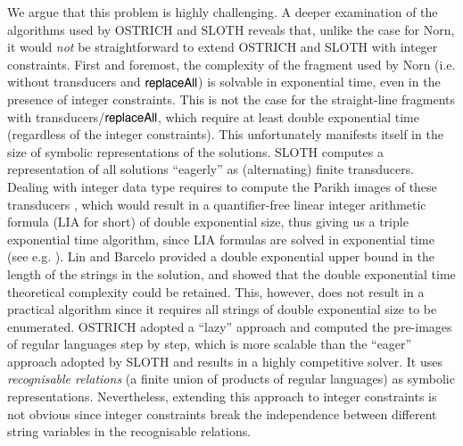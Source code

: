 We argue that this problem is highly challenging.
A deeper examination of the algorithms used by OSTRICH and SLOTH reveals that,
unlike the case for Norn, it would \emph{not} be straightforward to extend OSTRICH and 
SLOTH with integer constraints. First and foremost, the complexity of the
fragment used by Norn (i.e. without transducers and $\mathsf{replaceAll}$) is solvable
in exponential time, even in the presence of integer constraints. This is not
the case for the straight-line fragments with transducers/$\mathsf{replaceAll}$, which 
require at least double exponential time (regardless of the integer constraints).
This unfortunately manifests itself in the size of symbolic representations of 
the solutions. SLOTH \cite{HJLRV18} computes 
a representation of all
solutions ``eagerly'' as (alternating) finite transducers. Dealing with integer data type requires  
to compute the Parikh images of these transducers \cite{LB16}, which would 
result in a
quantifier-free linear integer arithmetic formula (LIA for short) of double exponential size, thus giving us a triple exponential time algorithm, since LIA formulas are solved in exponential time  (see e.g. \cite{VSS05}).
Lin and Barcelo \cite{LB16} provided a double exponential upper bound in the 
length of the strings in the solution, and showed that the double
exponential time theoretical complexity could be retained. This, however, does
not result in a practical algorithm since it requires all strings of double
exponential size to be enumerated. OSTRICH \cite{CHL+19} adopted a ``lazy'' approach and computed the pre-images of regular languages step by step,
which is more scalable than
the ``eager'' approach adopted by SLOTH and results in a highly competitive solver.
It uses \emph{recognisable relations} (a finite union of products of regular languages)
as symbolic representations. Nevertheless, extending this approach to integer
constraints is not obvious since integer constraints break the independence
between different string variables in the recognisable relations.




